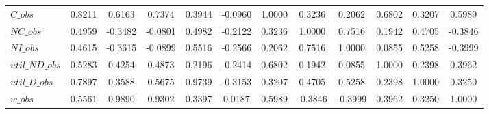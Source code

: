 \begin{center}
\begin{longtable}{lccccccccccc}
$C\_obs         $	 & 	           0.8211	 & 	           0.6163	 & 	           0.7374	 & 	           0.3944	 & 	          -0.0960	 & 	           1.0000	 & 	           0.3236	 & 	           0.2062	 & 	           0.6802	 & 	           0.3207	 & 	           0.5989 \\ 
$NC\_obs        $	 & 	           0.4959	 & 	          -0.3482	 & 	          -0.0801	 & 	           0.4982	 & 	          -0.2122	 & 	           0.3236	 & 	           1.0000	 & 	           0.7516	 & 	           0.1942	 & 	           0.4705	 & 	          -0.3846 \\ 
$NI\_obs        $	 & 	           0.4615	 & 	          -0.3615	 & 	          -0.0899	 & 	           0.5516	 & 	          -0.2566	 & 	           0.2062	 & 	           0.7516	 & 	           1.0000	 & 	           0.0855	 & 	           0.5258	 & 	          -0.3999 \\ 
$util\_ND\_obs  $	 & 	           0.5283	 & 	           0.4254	 & 	           0.4873	 & 	           0.2196	 & 	          -0.2414	 & 	           0.6802	 & 	           0.1942	 & 	           0.0855	 & 	           1.0000	 & 	           0.2398	 & 	           0.3962 \\ 
$util\_D\_obs   $	 & 	           0.7897	 & 	           0.3588	 & 	           0.5675	 & 	           0.9739	 & 	          -0.3153	 & 	           0.3207	 & 	           0.4705	 & 	           0.5258	 & 	           0.2398	 & 	           1.0000	 & 	           0.3250 \\ 
$w\_obs         $	 & 	           0.5561	 & 	           0.9890	 & 	           0.9302	 & 	           0.3397	 & 	           0.0187	 & 	           0.5989	 & 	          -0.3846	 & 	          -0.3999	 & 	           0.3962	 & 	           0.3250	 & 	           1.0000 \\ 
\end{longtable}
 \end{center}
